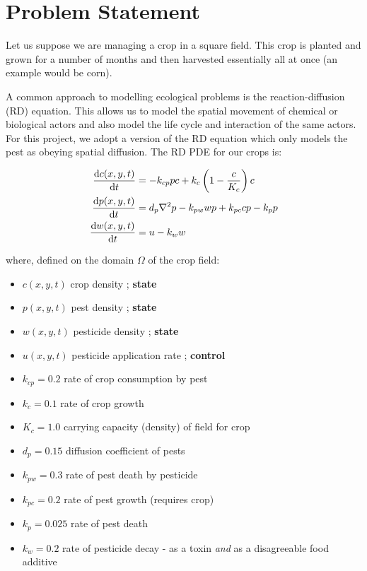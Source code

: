 \documentclass[11pt]{article}
\begin{document}
\section{Problem Statement}
Let us suppose we are managing a crop in a square field. This crop is planted and grown for a number of months and then harvested essentially all at once (an example would be corn).

A common approach to modelling ecological problems is the reaction-diffusion (RD) equation. This allows us to model the spatial movement of chemical or biological actors and also model the life cycle and interaction of the same actors. For this project, we adopt a version of the RD equation which only models the pest as obeying spatial diffusion. The RD PDE for our crops is:

\begin{align}
	\dv{c(x,y,t)}{t} &= -k_{cp} p c + k_c \left( 1 - \frac{c}{K_c} \right) c \nonumber \\ 
	\dv{p(x,y,t)}{t} &= d_p \laplacian{p} - k_{pw} w p + k_{pc} c p - k_p p \\
	\dv{w(x,y,t)}{t} &= u - k_w w \nonumber
\end{align}

where, defined on the domain $\Omega$ of the crop field:

\begin{itemize}
\setlength\itemsep{-1pt}
\item $c(x,y,t)$ crop density ; \textbf{state}
\item $p(x,y,t)$ pest density ; \textbf{state}
\item $w(x,y,t)$ pesticide density ; \textbf{state}
\item $u(x,y,t)$ pesticide application rate ; \textbf{control}
\item $k_{cp} = 0.2$ rate of crop consumption by pest
\item $k_c = 0.1$ rate of crop growth
\item $K_c = 1.0$ carrying capacity (density) of field for crop
\item $d_p = 0.15$ diffusion coefficient of pests
\item $k_{pw} = 0.3$ rate of pest death by pesticide
\item $k_{pc} = 0.2$ rate of pest growth (requires crop)
\item $k_p = 0.025$ rate of pest death
\item $k_w = 0.2$ rate of pesticide decay - as a toxin \textit{and} as a disagreeable food additive \cite{R4}
\end{itemize}
\end{document}
